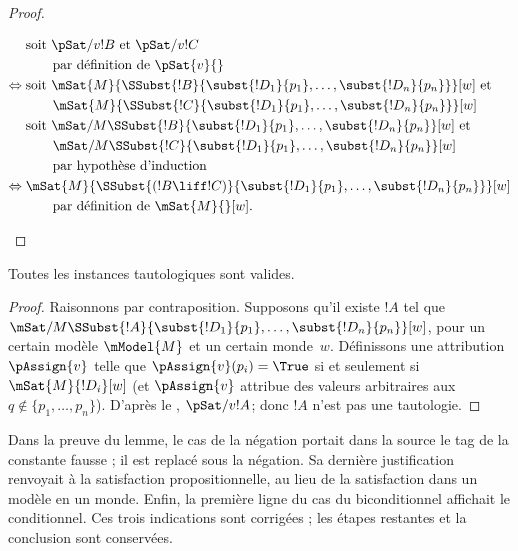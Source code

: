 \documentclass[../../../include/open-logic-section]{subfiles}
\begin{document}
\begin{proof}
\begin{enumerate}
{{\begin{align*}
        & \text{soit } \pSat/{v}{!B} \text{ et } \pSat/{v}{!C}\\
        &\qquad \text{par définition de $\pSat{v}{}$}\\
        \Leftrightarrow {} &
        \text{soit } \mSat{M}{\SSubst{!B}{\subst{!D_1}{p_1}, \dots,
            \subst{!D_n}{p_n}}}[w] \text{ et }\\
        & \qquad \mSat{M}{\SSubst{!C}{\subst{!D_1}{p_1}, \dots,
          \subst{!D_n}{p_n}}}[w]\\ 
        &  \text{soit } \mSat/{M}{\SSubst{!B}{\subst{!D_1}{p_1}, \dots,
            \subst{!D_n}{p_n}}}[w] \text{ et }\\
        & \qquad \mSat/{M}{\SSubst{!C}{\subst{!D_1}{p_1}, \dots,
          \subst{!D_n}{p_n}}}[w]\\
        &\qquad\text{par hypothèse d'induction}\\
        \Leftrightarrow {} &
        \mSat{M}{\SSubst{(!B \liff !C)}{\subst{!D_1}{p_1}, \dots,
          \subst{!D_n}{p_n}}}[w]\\
        &\qquad \text{par définition de $\mSat{M}{}[w]$}.
      \end{align*}}}{}
  \end{enumerate}
  \end{proof}

\begin{prop}
  Toutes les instances tautologiques sont valides.
\end{prop}

\begin{proof}
  Raisonnons par contraposition. Supposons qu'il existe $!A$ tel que
  $\mSat/{M}{\SSubst{!A}{\subst{!D_1}{p_1}, \dots,
  \subst{!D_n}{p_n}}}[w]$, pour un certain modèle $\mModel{M}$ et
  un certain monde~$w$. Définissons une attribution $\pAssign{v}$
  telle que $\pAssign{v}(p_i) = \True$ si et seulement si
  $\mSat{M}{!D_i}[w]$ (et $\pAssign{v}$ attribue des valeurs
  arbitraires aux $q \notin \{p_1, \dots, p_n \}$). D'après le
  , $\pSat/{v}{!A}$; donc $!A$ n'est pas une
  tautologie.
\end{proof}
\begin{editorial}Dans la preuve du lemme, le cas de la négation portait dans la source le tag de la constante fausse ; il est replacé sous la négation. Sa dernière justification renvoyait à la satisfaction propositionnelle, au lieu de la satisfaction dans un modèle en un monde. Enfin, la première ligne du cas du biconditionnel affichait le conditionnel. Ces trois indications sont corrigées ; les étapes restantes et la conclusion sont conservées.\end{editorial}
\end{document}
